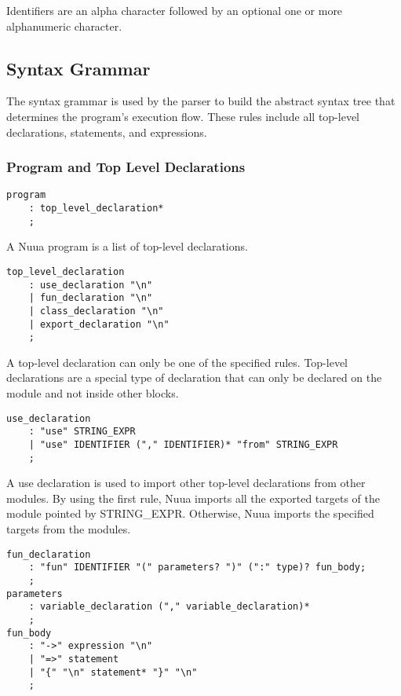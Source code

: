 Identifiers are an alpha character followed by an optional one or more alphanumeric character.

\subsection{Syntax Grammar}

The syntax grammar is used by the parser to build the abstract syntax tree that determines the program's execution flow.
These rules include all top-level declarations, statements, and expressions.

\subsubsection{Program and Top Level Declarations}
\label{sec:program_tld}

\begin{lstlisting}
program
    : top_level_declaration*
    ;
\end{lstlisting}

A Nuua program is a list of top-level declarations.

\begin{lstlisting}
top_level_declaration
    : use_declaration "\n"
    | fun_declaration "\n"
    | class_declaration "\n"
    | export_declaration "\n"
    ;
\end{lstlisting}

A top-level declaration can only be one of the specified rules. Top-level declarations are
a special type of declaration that can only be declared on the module and not inside other blocks.

\begin{lstlisting}
use_declaration
    : "use" STRING_EXPR
    | "use" IDENTIFIER ("," IDENTIFIER)* "from" STRING_EXPR
    ;
\end{lstlisting}

A use declaration is used to import other top-level declarations from other modules. By using the first rule, Nuua imports all the
exported targets of the module pointed by STRING\_EXPR. Otherwise, Nuua imports the specified targets from the modules.

\begin{lstlisting}
fun_declaration
    : "fun" IDENTIFIER "(" parameters? ")" (":" type)? fun_body;
    ;
parameters
    : variable_declaration ("," variable_declaration)*
    ;
fun_body
    : "->" expression "\n"
    | "=>" statement
    | "{" "\n" statement* "}" "\n"
    ;
\end{lstlisting}

